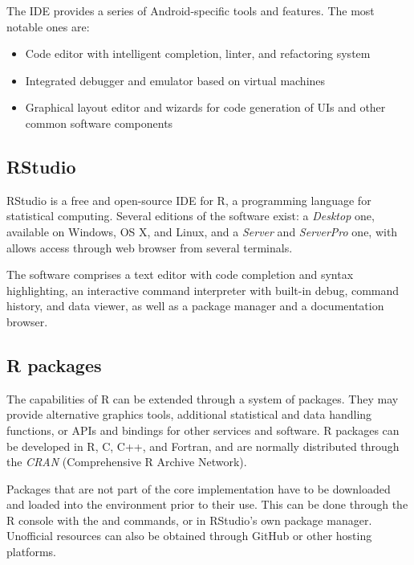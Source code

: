 The IDE provides a series of Android-specific tools and features.
The most notable ones are:

\begin{itemize}
	\item Code editor with intelligent completion, linter, and refactoring system
	\item Integrated debugger and emulator based on virtual machines
	\item Graphical layout editor and wizards for code generation of UIs and other common software components
\end{itemize}



\subsection{RStudio}
RStudio is a free and open-source IDE for R, a programming language for statistical computing.
Several editions of the software exist: a \emph{Desktop} one, available on Windows, OS X, and Linux, and a \emph{Server} and \emph{ServerPro} one, with allows access through web browser from several terminals.

The software comprises a text editor with code completion and syntax highlighting, an interactive command interpreter with built-in debug, command history, and data viewer, as well as a package manager and a documentation browser.



\subsection{R packages}
The capabilities of R can be extended through a system of packages.
They may provide alternative graphics tools, additional statistical and data handling functions, or APIs and bindings for other services and software.
R packages can be developed in R, C, C++, and Fortran, and are normally distributed through the \emph{CRAN} (Comprehensive R Archive Network).

Packages that are not part of the core implementation have to be downloaded and loaded into the environment prior to their use.
This can be done through the R console with the  and  commands, or in RStudio's own package manager.
Unofficial resources can also be obtained through GitHub or other hosting platforms.


